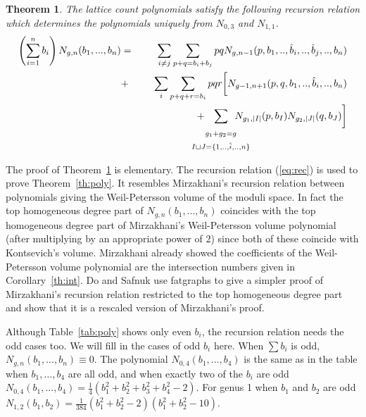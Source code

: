 \documentclass{amsart}
\newtheorem{theorem}{Theorem}
\begin{document}
\begin{theorem}   \label{th:recurs}
The lattice count polynomials satisfy the following recursion relation which determines the polynomials uniquely from $N_{0,3}$ and $N_{1,1}$.
{\setlength\arraycolsep{2pt} 
\begin{eqnarray}    \label{eq:rec}
\left(\sum_{i=1}^nb_i\right)N_{g,n}(b_1,...,b_n)&=&\sum_{i\neq j}\sum_{p+q=b_i+b_j}pqN_{g,n-1}(p,b_1,..,\hat{b}_i,..,\hat{b}_j,..,b_n)\nonumber\\
&+&\sum_i\sum_{p+q+r=b_i} pqr\biggl[N_{g-1,n+1}(p,q,b_1,..,\hat{b}_i,..,b_n)\\
&&\hspace{20mm}+\hspace{-7mm}\sum_{\begin{array}{c}_{g_1+g_2=g}\\_{I\sqcup J=\{1,..,\hat{i},..,n\}}\end{array}}\hspace{-8mm}N_{g_1,|I|}(p,b_I)N_{g_2,|J|}(q,b_J)\biggr]\nonumber
\end{eqnarray}}
\end{theorem}
The proof of Theorem~\ref{th:recurs} is elementary.  The recursion relation (\ref{eq:rec}) is used to prove Theorem~\ref{th:poly}.  It resembles Mirzakhani's recursion relation \cite{MirSim} between polynomials giving the Weil-Petersson volume of the moduli space.  In fact the top homogeneous degree part of $N_{g,n}(b_1,...,b_n)$ coincides with the top homogeneous degree part of Mirzakhani's Weil-Petersson volume polynomial (after multiplying by an appropriate power of $2$) since both of these coincide with Kontsevich's volume.  Mirzakhani \cite{MirWei} already showed the coefficients of the Weil-Petersson volume polynomial are the intersection numbers given in Corollary~\ref{th:int}.  Do and Safnuk \cite{DSaHyp} use fatgraphs to give a simpler proof of Mirzakhani's recursion relation restricted to the top homogeneous degree part and show that it is a rescaled version of Mirzakhani's proof.   

Although Table~\ref{tab:poly} shows only even $b_i$, the recursion relation needs the odd cases too.  We will fill in the cases of odd $b_i$ here.  When $\sum b_i$ is odd, $N_{g,n}(b_1,...,b_n)\equiv 0$.  The polynomial $N_{0,4}(b_1,...,b_4)$ is the same as in the table when $b_1,...,b_4$ are all odd, and when exactly two of the $b_i$ are odd $N_{0,4}(b_1,...,b_4)=\frac{1}{4}\left(b_1^2+b_2^2+b_3^2+b_4^2-2\right)$.  For genus 1 when $b_1$ and $b_2$ are odd $N_{1,2}(b_1,b_2)=\frac{1}{384}\left(b_1^2+b_2^2-2\right)\left(b_1^2+b_2^2-10\right)$.
\end{document}
